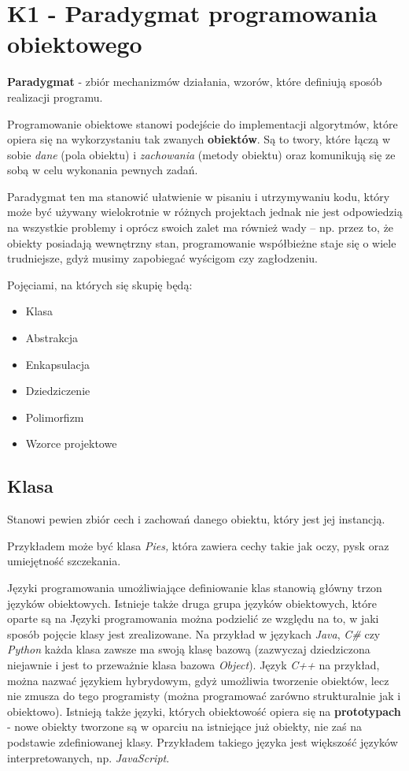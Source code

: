 \section{K1 - Paradygmat programowania obiektowego}

\textbf{Paradygmat} - zbiór mechanizmów działania, wzorów, które definiują sposób realizacji programu.

Programowanie obiektowe stanowi podejście do implementacji algorytmów, które opiera się na wykorzystaniu tak zwanych \textbf{obiektów}. Są to twory, które łączą w sobie \textit{dane} (pola obiektu) i \textit{zachowania} (metody obiektu) oraz komunikują się ze sobą w celu wykonania pewnych zadań.

Paradygmat ten ma stanowić ułatwienie w pisaniu i utrzymywaniu kodu, który może być używany wielokrotnie w różnych projektach jednak nie jest odpowiedzią na wszystkie problemy i oprócz swoich zalet ma również wady -- np. przez to, że obiekty posiadają wewnętrzny stan, programowanie współbieżne staje się o wiele trudniejsze, gdyż musimy zapobiegać wyścigom czy zagłodzeniu.

Pojęciami, na których się skupię będą:
\begin{itemize}
	\item Klasa
	\item Abstrakcja
	\item Enkapsulacja
	\item Dziedziczenie
	\item Polimorfizm
	\item Wzorce projektowe
\end{itemize}

\subsection{Klasa}
Stanowi pewien zbiór cech i zachowań danego obiektu, który jest jej instancją.

Przykładem może być klasa \textit{Pies,} która zawiera cechy takie jak oczy, pysk oraz umiejętność szczekania.

Języki programowania umożliwiające definiowanie klas stanowią główny trzon języków obiektowych. Istnieje także druga grupa języków obiektowych, które oparte są na 
Języki programowania można podzielić ze względu na to, w jaki sposób pojęcie klasy jest zrealizowane. Na przykład w językach \textit{Java}, \textit{C\#} czy \textit{Python} każda klasa zawsze ma swoją klasę bazową (zazwyczaj dziedziczona niejawnie i jest to przeważnie klasa bazowa \textit{Object}). Język \textit{C++} na przykład, można nazwać językiem hybrydowym, gdyż umożliwia tworzenie obiektów, lecz nie zmusza do tego programisty (można programować zarówno strukturalnie jak i obiektowo). Istnieją także języki, których obiektowość opiera się na \textbf{prototypach} - nowe obiekty tworzone są w oparciu na istniejące już obiekty, nie zaś na podstawie zdefiniowanej klasy. Przykładem takiego języka jest większość języków interpretowanych, np. \textit{JavaScript}.

